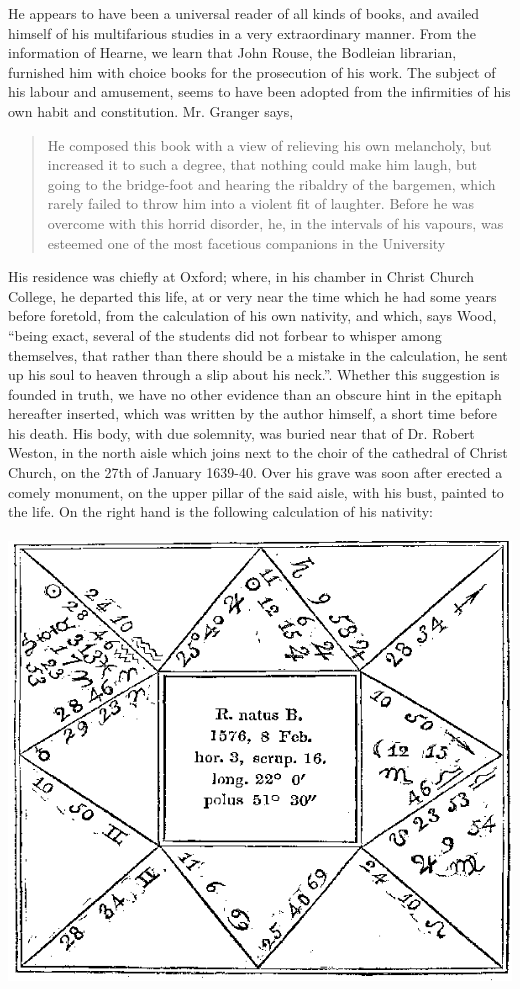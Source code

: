 He appears to have been a universal reader of all kinds of books, and availed himself of his multifarious studies in a very extraordinary manner.
From the information of Hearne, we learn that John Rouse, the Bodleian librarian, furnished him with choice books for the prosecution of his work.
The subject of his labour and amusement, seems to have been adopted from the infirmities of his own habit and constitution.
Mr. Granger says, \blockquote{He composed this book with a view of relieving his own melancholy, but increased it to such a degree, that nothing could make him laugh, but going to the bridge-foot and hearing the ribaldry of the bargemen, which rarely failed to throw him into a violent fit of laughter.
Before he was overcome with this horrid disorder, he, in the intervals of his vapours, was esteemed one of the most facetious companions in the University}.

His residence was chiefly at Oxford; where, in his chamber in Christ Church College, he departed this life, at or very near the time which he had some years before foretold, from the calculation of his own nativity, and which, says Wood,
\enquote{being exact, several of the students did not forbear to whisper among themselves, that rather than there should be a mistake in the calculation, he sent up his soul to heaven through a slip about his neck.}. Whether this suggestion is founded in truth, we have no other evidence than an obscure hint in the epitaph hereafter inserted, which was written by the author himself, a short time before his death. His body, with due solemnity, was buried near that of Dr. Robert Weston, in the north aisle which joins next to the choir of the cathedral of Christ Church, on the 27th of January 1639-40.
Over his grave was soon after erected a comely monument, on the upper pillar of the said aisle, with his bust, painted to the life. On the right hand is the following calculation of his nativity:
\\
\\
\includegraphics[width=\textwidth,keepaspectratio]{horoscope}

